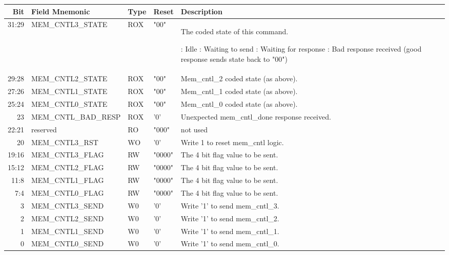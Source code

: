\begin{tabularx}{\textwidth}{r|l|l|l|X}
  \hline
  Bit & Field Mnemonic & Type & Reset & Description \\ \hline

  31:29 & MEM\_CNTL3\_STATE & ROX  & "00" & The coded state of this command.

  \setlength\parindent{24pt}
  \indent 00 : Idle   \newline
  \indent 01 : Waiting to send \newline
  \indent 10 : Waiting for response \newline
  \indent 11 : Bad response received (good response \indent sends state back to "00") \\
  29:28 & MEM\_CNTL2\_STATE & ROX  & "00" & Mem\_cntl\_2 coded state (as above). \\
  27:26 & MEM\_CNTL1\_STATE & ROX  & "00" & Mem\_cntl\_1 coded state (as above). \\
  25:24 & MEM\_CNTL0\_STATE & ROX  & "00" & Mem\_cntl\_0 coded state (as above). \\
  23    & MEM\_CNTL\_BAD\_RESP & ROX & '0' & Unexpected mem\_cntl\_done response received. \\
  22:21 & reserved            & RO  & "000" & not used \\
  20    & MEM\_CNTL3\_RST   & WO   & '0'   & Write 1 to reset mem\_cntl logic. \\
  19:16 & MEM\_CNTL3\_FLAG  & RW   & "0000" & The 4 bit flag value to be sent. \\
  15:12 & MEM\_CNTL2\_FLAG  & RW   & "0000" & The 4 bit flag value to be sent. \\
  11:8  & MEM\_CNTL1\_FLAG  & RW   & "0000" & The 4 bit flag value to be sent. \\
  7:4   & MEM\_CNTL0\_FLAG  & RW   & "0000" & The 4 bit flag value to be sent. \\
  3     & MEM\_CNTL3\_SEND  & W0   & '0'    & Write '1' to send mem\_cntl\_3. \\
  2     & MEM\_CNTL2\_SEND  & W0   & '0'    & Write '1' to send mem\_cntl\_2. \\
  1     & MEM\_CNTL1\_SEND  & W0   & '0'    & Write '1' to send mem\_cntl\_1. \\
  0     & MEM\_CNTL0\_SEND  & W0   & '0'    & Write '1' to send mem\_cntl\_0. \\
\end{tabularx}

